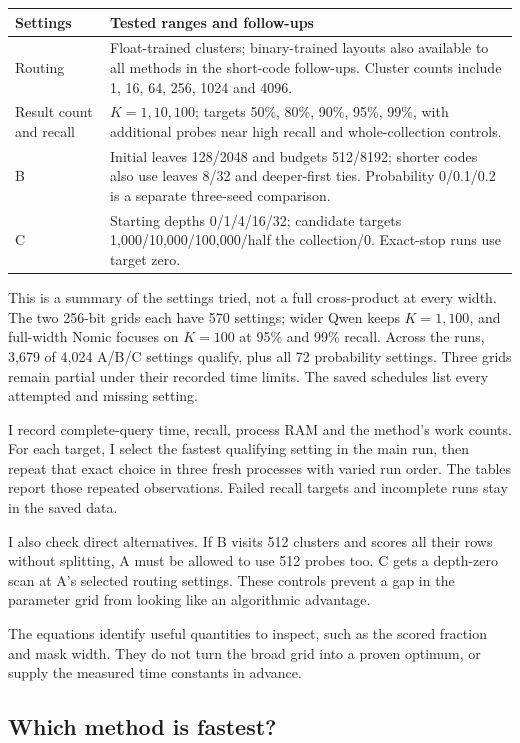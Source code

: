 \begin{center}\small
\begin{tabularx}{\linewidth}{@{}lY@{}}\toprule
Settings & Tested ranges and follow-ups\\\midrule
Routing & Float-trained clusters; binary-trained layouts also available to all methods in the short-code follow-ups. Cluster counts include 1, 16, 64, 256, 1024 and 4096.\\
Result count and recall & $K=1,10,100$; targets 50\%, 80\%, 90\%, 95\%, 99\%, with additional probes near high recall and whole-collection controls.\\
B & Initial leaves 128/2048 and budgets 512/8192; shorter codes also use leaves 8/32 and deeper-first ties. Probability 0/0.1/0.2 is a separate three-seed comparison.\\
C & Starting depths 0/1/4/16/32; candidate targets 1,000/10,000/100,000/half the collection/0. Exact-stop runs use target zero.\\\bottomrule
\end{tabularx}
\end{center}
This is a summary of the settings tried, not a full cross-product at every width. The two 256-bit grids each have 570 settings; wider Qwen keeps $K=1,100$, and full-width Nomic focuses on $K=100$ at 95\% and 99\% recall. Across the runs, 3,679 of 4,024 A/B/C settings qualify, plus all 72 probability settings. Three grids remain partial under their recorded time limits. The saved schedules list every attempted and missing setting.

I record complete-query time, recall, process RAM and the method's work counts. For each target, I select the fastest qualifying setting in the main run, then repeat that exact choice in three fresh processes with varied run order. The tables report those repeated observations. Failed recall targets and incomplete runs stay in the saved data.

I also check direct alternatives. If B visits 512 clusters and scores all their rows without splitting, A must be allowed to use 512 probes too. C gets a depth-zero scan at A's selected routing settings. These controls prevent a gap in the parameter grid from looking like an algorithmic advantage.

The equations identify useful quantities to inspect, such as the scored fraction and mask width. They do not turn the broad grid into a proven optimum, or supply the measured time constants in advance.

\subsection{Which method is fastest?}


